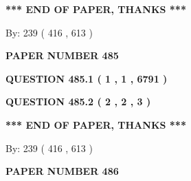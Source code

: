 \documentclass[12pt]{article}
\begin{document}
  
   
   
 \vspace{0.2in}
 
   
   
   
   
\vspace{1.0in} 
{\textbf{\large{ *** END OF PAPER, THANKS *** }}} 
   
   
\hspace{1.0in} By: 
 239 ( 416 ,  613 )
   
   
   
   
\newpage 
\setcounter{page}{ 
   485001 } 
   
   
   
   
 {\textbf{ \Large{ PAPER NUMBER  485  }}}
   
   
\vspace{0.2in}
   
   
   
   
   
   
 \vspace{0.2in}
 
 
 
 
   
   
  
\vspace{0.2in}
  
{\textbf{\Large{QUESTION
485.1 
 ( 1 , 1 , 6791 )
}}}
  
  
  
\vspace{0.2in}
  
{\textbf{\Large{QUESTION
485.2 
 ( 2 , 2 , 3 )
}}}
  
  
   
   
 \vspace{0.2in}
 
   
   
   
   
\vspace{1.0in} 
{\textbf{\large{ *** END OF PAPER, THANKS *** }}} 
   
   
\hspace{1.0in} By: 
 239 ( 416 ,  613 )
   
   
   
   
\newpage 
\setcounter{page}{ 
   486001 } 
   
   
   
   
 {\textbf{ \Large{ PAPER NUMBER  486  }}}
   
\end{document}
